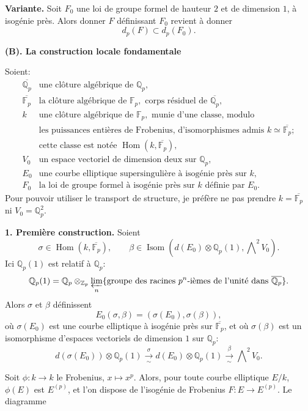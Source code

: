 \documentclass[11pt]{article}
\newcommand{\Fp}{\mathbb{F}_{p}}
\newcommand{\Qp}{\mathbb{Q}_{p}}
\newcommand{\Zp}{\mathbb{Z}_{p}}
\newcommand{\Hom}{\operatorname{Hom}}
\newcommand{\Isom}{\operatorname{Isom}}
\newcommand{\Prolim}{\varprojlim}
\begin{document}
\textbf{Variante.} Soit \(F_0\) une loi de groupe formel de hauteur \(2\) et de dimension \(1\), à isogénie près. Alors donner \(F\) définissant \(F_0\) revient à donner
\[
d_p(F)\subset d_p(F_0).
\]

\begin{center}
\textbf{(B). La construction locale fondamentale}
\end{center}

Soient:
\[
\begin{array}{ll}
\overline{\Qp} & \text{une clôture algébrique de }\Qp,\\
\overline{\Fp} & \text{la clôture algébrique de }\Fp,\text{ corps résiduel de }\overline{\Qp},\\
k & \text{une clôture algébrique de }\Fp,\text{ munie d'une classe, modulo}\\
  & \text{les puissances entières de Frobenius, d'isomorphismes admis }k\simeq\overline{\Fp};\\
  & \text{cette classe est notée }\Hom(k,\overline{\Fp}),\\
V_0 & \text{un espace vectoriel de dimension deux sur }\Qp,\\
E_0 & \text{une courbe elliptique supersingulière à isogénie près sur }k,\\
F_0 & \text{la loi de groupe formel à isogénie près sur }k\text{ définie par }E_0 .
\end{array}
\]
Pour pouvoir utiliser le transport de structure, je préfère ne pas prendre \(k=\overline{\Fp}\) ni \(V_0=\Qp^2\).

\textbf{1. Première construction.} Soient
\[
\sigma\in\Hom(k,\overline{\Fp}),\qquad
\beta\in\Isom\!\left(d(E_0)\otimes\Qp(1),\bigwedge\nolimits^2V_0\right).
\]
Ici \(\Qp(1)\) est relatif à \(\Qp\):
\[
\Qp(1)=\Qp\otimes_{\Zp}\Prolim_n
\{\text{groupe des racines }p^n\text{-ièmes de l'unité dans }\overline{\Qp}\}.
\]
Alors \(\sigma\) et \(\beta\) définissent
\[
E_0(\sigma,\beta)=(\sigma(E_0),\sigma(\beta)),
\]
où \(\sigma(E_0)\) est une courbe elliptique à isogénie près sur \(\overline{\Fp}\), et où \(\sigma(\beta)\) est un isomorphisme d'espaces vectoriels de dimension \(1\) sur \(\Qp\):
\[
d(\sigma(E_0))\otimes\Qp(1)\xrightarrow[\sim]{\sigma}
d(E_0)\otimes\Qp(1)\xrightarrow[\sim]{\beta}\bigwedge\nolimits^2V_0 .
\]

Soit \(\phi:k\to k\) le Frobenius, \(x\mapsto x^p\). Alors, pour toute courbe elliptique \(E/k\), \(\phi(E)\) est \(E^{(p)}\), et l'on dispose de l'isogénie de Frobenius \(F:E\to E^{(p)}\). Le diagramme
\end{document}
